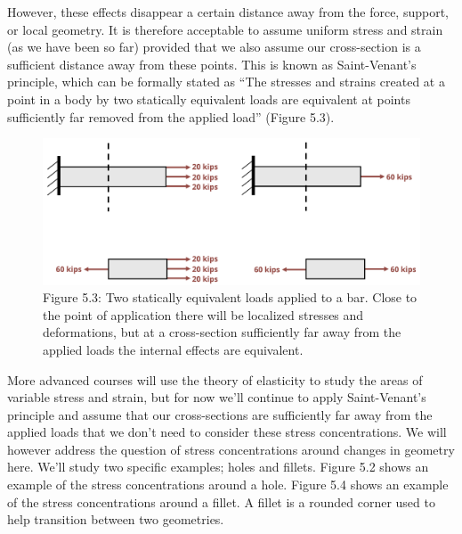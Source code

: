 \documentclass[
  letterpaper,
  DIV=11,
  numbers=noendperiod]{scrreprt}
\begin{document}
However, these effects disappear a certain distance away from the force,
support, or local geometry. It is therefore acceptable to assume uniform
stress and strain (as we have been so far) provided that we also assume
our cross-section is a sufficient distance away from these points. This
is known as Saint-Venant's principle, which can be formally stated as
``The stresses and strains created at a point in a body by two
statically equivalent loads are equivalent at points sufficiently far
removed from the applied load'' (Figure 5.3).

\begin{figure}[H]

{\centering \includegraphics[width=5.88542in,height=\textheight]{images/PNGs/Figure 5.3.png}

}

\caption{Figure 5.3: Two statically equivalent loads applied to a bar.
Close to the point of application there will be localized stresses and
deformations, but at a cross-section sufficiently far away from the
applied loads the internal effects are equivalent.}

\end{figure}%

More advanced courses will use the theory of elasticity to study the
areas of variable stress and strain, but for now we'll continue to apply
Saint-Venant's principle and assume that our cross-sections are
sufficiently far away from the applied loads that we don't need to
consider these stress concentrations. We will however address the
question of stress concentrations around changes in geometry here. We'll
study two specific examples; holes and fillets. Figure 5.2 shows an
example of the stress concentrations around a hole. Figure 5.4 shows an
example of the stress concentrations around a fillet. A fillet is a
rounded corner used to help transition between two geometries.
\end{document}
